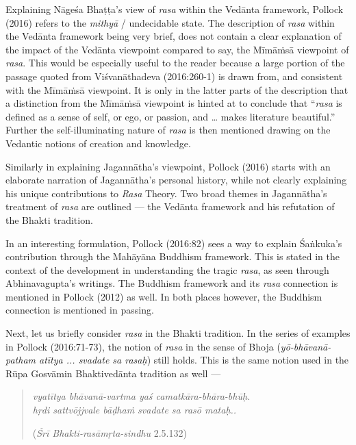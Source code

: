 Explaining Nāgeśa Bhaṭṭa’s view of \textsl{rasa} within the Vedānta framework, Pollock (2016) refers to the \textsl{mithyā} / undecidable state. The description of \textsl{rasa} within the Vedānta framework being very brief, does not contain a clear explanation of the impact of the Vedānta viewpoint compared to say, the Mīmāṁsā viewpoint of \textsl{rasa}. This would be especially useful to the reader because a large portion of the passage quoted from Viśvanāthadeva (2016:260-1) is drawn from, and consistent with the Mīmāṁsā viewpoint. It is only in the latter parts of the description that a distinction from the Mīmāṁsā viewpoint is hinted at to conclude that “\textsl{rasa} is defined as a sense of self, or ego, or passion, and … makes literature beautiful.” Further the self-illuminating nature of \textsl{rasa} is then mentioned drawing on the Vedantic notions of creation and knowledge. 

Similarly in explaining Jagannātha’s viewpoint, Pollock (2016) starts with an elaborate narration of Jagannātha’s personal history, while not clearly explaining his unique contributions to \textsl{Rasa} Theory. Two broad themes in Jagannātha’s treatment of \textsl{rasa} are outlined --- the Vedānta framework and his refutation of the Bhakti tradition. 

In an interesting formulation, Pollock (2016:82) sees a way to explain Śaṅkuka’s contribution through the Mahāyāna Buddhism framework. This is stated in the context of the development in understanding the tragic \textsl{rasa}, as seen through Abhinavagupta’s writings. The Buddhism framework and its \textsl{rasa} connection is mentioned in Pollock (2012) as well. In both places however, the Buddhism connection is mentioned in passing. 

Next, let us briefly consider \textsl{rasa} in the Bhakti tradition. In the series of examples in Pollock (2016:71-73), the notion of \textsl{rasa} in the sense of Bhoja (\textsl{yō-bhāvanā-patham atītya ... svadate sa rasaḥ}) still holds. This is the same notion used in the Rūpa Gosvāmin Bhaktivedānta
 tradition as well --- 
\begin{quote}
\textsl{vyatītya bhāvanā-vartma yaś camatkāra-bhāra-bhūḥ.}\\
\textsl{hṛdi sattvōjjvale bāḍhaṁ svadate sa rasō mataḥ..}

\hfill (\textsl{Śrī Bhakti-rasāmṛta-sindhu} 2.5.132)
\end{quote}

